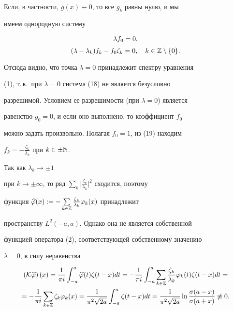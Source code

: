 Если, в частности, $g(x)\equiv 0$, то все $g_{k}$ равны нулю, и мы


имеем однородную систему


\begin{equation}


\begin{array}{c}


\lambda f_{0}=0, \\[2mm]


(\lambda-\lambda_{k})f_{k}-f_{0}\zeta_{k}=0,


\quad k\in \Bbb{Z}\setminus \{0\}.


\end{array}


\end{equation}


Отсюда видно, что точка $\lambda=0$ принадлежит спектру уравнения


(1), т.\,к.\ при $\lambda=0$ система (18) не является безусловно


разрешимой. Условием ее разрешимости (при $\lambda=0$) является


равенство $g_{0}=0$, и если оно выполнено, то коэффициент $f_{0}$


можно задать произвольно. Полагая $f_{0}=1$, из (19) находим


$f_{k}=-\frac{\zeta_{k}}{\lambda_{k}}$ при $k\in \pm\Bbb{N}$.


Так как $\lambda_{k}\rightarrow \pm 1$


при $k\rightarrow \pm\infty$, то ряд $\sum\limits_{k}\big|


\frac{\zeta_{k}}{\lambda_{k}}\big|^{2}$ сходится, поэтому


функция $\widehat{\varphi}(x):=-\sum\limits_{k\in \Bbb{Z}}


\frac{\zeta_{k}}{\lambda_{k}} \varphi_{k}(x)$ принадлежит


пространству $L^{2}(-a,a)$. Однако она не является собственной


функцией оператора (2), соответствующей собственному значению


$\lambda=0$, в силу неравенства


\begin{multline*}


\left(\cal{K}\widehat{\varphi}\right)(x)=\dfrac{1}{\pi i}


\int^{a}_{-a}\widehat{\varphi}(t)\zeta(t-x)dt=


-\dfrac{1}{\pi i}\int^{a}_{-a}


\sum_{k\in \Bbb{Z}}\dfrac{\zeta_{k}}{\lambda_{k}}


\varphi_{k}(t)\zeta(t-x)dt= \\


%


=-\dfrac{1}{\pi i}\sum_{k\in \Bbb{Z}}\zeta_{k}


\varphi_{k}(x)=\dfrac{1}{\pi^{2}\sqrt{2a}}\int


^{a}_{-a}\zeta(t-x)dt=\dfrac{1}{\pi^{2}\sqrt{2a}}\ln


\dfrac{\sigma(a-x)}{\sigma(a+x)}\not\equiv 0.


\end{multline*}


